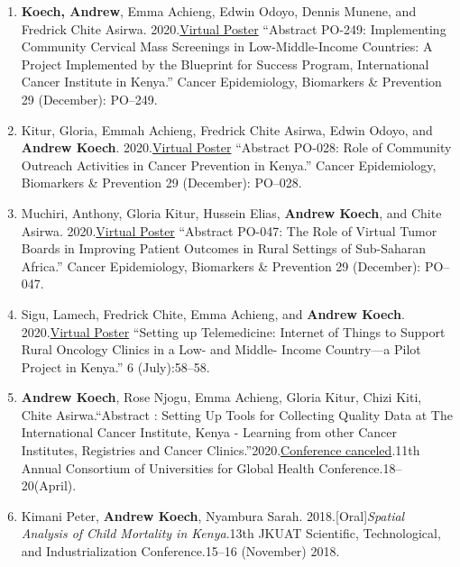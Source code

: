 \documentclass[13pt,]{article}
\begin{document}
\begin{enumerate}
\def\labelenumi{\arabic{enumi}.}
\item
  \textbf{Koech, Andrew}, Emma Achieng, Edwin Odoyo, Dennis Munene, and
  Fredrick Chite Asirwa.
  2020.\href{https://doi.org/10.1158/1538-7755.DISP20-PO-249.}{Virtual
  Poster} ``Abstract PO-249: Implementing Community Cervical Mass
  Screenings in Low-Middle-Income Countries: A Project Implemented by
  the Blueprint for Success Program, International Cancer Institute in
  Kenya.'' Cancer Epidemiology, Biomarkers \& Prevention 29 (December):
  PO--249.
\item
  Kitur, Gloria, Emmah Achieng, Fredrick Chite Asirwa, Edwin Odoyo, and
  \textbf{Andrew Koech}.
  2020.\href{https://doi.org/10.1158/1538-7755.DISP20-PO-028.}{Virtual
  Poster} ``Abstract PO-028: Role of Community Outreach Activities in
  Cancer Prevention in Kenya.'' Cancer Epidemiology, Biomarkers \&
  Prevention 29 (December): PO--028.
\item
  Muchiri, Anthony, Gloria Kitur, Hussein Elias, \textbf{Andrew Koech},
  and Chite Asirwa.
  2020.\href{https://doi.org/10.1158/1538-7755.DISP20-PO-047.}{Virtual
  Poster} ``Abstract PO-047: The Role of Virtual Tumor Boards in
  Improving Patient Outcomes in Rural Settings of Sub-Saharan Africa.''
  Cancer Epidemiology, Biomarkers \& Prevention 29 (December): PO--047.
\item
  Sigu, Lamech, Fredrick Chite, Emma Achieng, and \textbf{Andrew Koech}.
  2020.\href{https://doi.org/10.1200/GO.20.54000}{Virtual Poster}
  ``Setting up Telemedicine: Internet of Things to Support Rural
  Oncology Clinics in a Low- and Middle- Income Country---a Pilot
  Project in Kenya.'' 6 (July):58--58.
\item
  \textbf{Andrew Koech}, Rose Njogu, Emma Achieng, Gloria Kitur, Chizi
  Kiti, Chite Asirwa.``Abstract : Setting Up Tools for Collecting
  Quality Data at The International Cancer Institute, Kenya - Learning
  from other Cancer Institutes, Registries and Cancer
  Clinics.''2020.\href{https://www.dropbox.com/s/lq0owvwya6dcjfh/1\%20CUGH\%202020\%20eBook_Abstracts_Global\%20Health\%20Education.pdf?dl=0}{Conference
  canceled}.11th Annual Consortium of Universities for Global Health
  Conference.18--20(April).
\item
  Kimani Peter, \textbf{Andrew Koech}, Nyambura Sarah.
  2018.{[}Oral{]}\emph{Spatial Analysis of Child Mortality in
  Kenya}.13th JKUAT Scientific, Technological, and Industrialization
  Conference.15--16 (November) 2018.
\end{enumerate}
\end{document}
